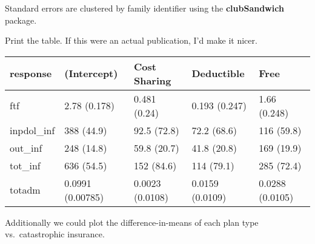 \documentclass[]{book}
\newenvironment{Shaded}{\begin{snugshade}}{\end{snugshade}}
\newcommand{\KeywordTok}[1]{\textcolor[rgb]{0.13,0.29,0.53}{\textbf{#1}}}
\newcommand{\DataTypeTok}[1]{\textcolor[rgb]{0.13,0.29,0.53}{#1}}
\newcommand{\DecValTok}[1]{\textcolor[rgb]{0.00,0.00,0.81}{#1}}
\newcommand{\StringTok}[1]{\textcolor[rgb]{0.31,0.60,0.02}{#1}}
\newcommand{\OtherTok}[1]{\textcolor[rgb]{0.56,0.35,0.01}{#1}}
\newcommand{\ControlFlowTok}[1]{\textcolor[rgb]{0.13,0.29,0.53}{\textbf{#1}}}
\newcommand{\OperatorTok}[1]{\textcolor[rgb]{0.81,0.36,0.00}{\textbf{#1}}}
\newcommand{\NormalTok}[1]{#1}
\theoremstyle{definition}
\theoremstyle{definition}
\theoremstyle{definition}
\theoremstyle{remark}
\begin{document}
Standard errors are clustered by family identifier using the
\textbf{clubSandwich} package.

Print the table. If this were an actual publication, I'd make it nicer.

\begin{Shaded}
\end{Shaded}

\begin{tabular}{l|l|l|l|l}
\hline
response & (Intercept) & Cost Sharing & Deductible & Free\\
\hline
ftf & 2.78 (0.178) & 0.481 (0.24) & 0.193 (0.247) & 1.66 (0.248)\\
\hline
inpdol\_inf & 388 (44.9) & 92.5 (72.8) & 72.2 (68.6) & 116 (59.8)\\
\hline
out\_inf & 248 (14.8) & 59.8 (20.7) & 41.8 (20.8) & 169 (19.9)\\
\hline
tot\_inf & 636 (54.5) & 152 (84.6) & 114 (79.1) & 285 (72.4)\\
\hline
totadm & 0.0991 (0.00785) & 0.0023 (0.0108) & 0.0159 (0.0109) & 0.0288 (0.0105)\\
\hline
\end{tabular}

Additionally we could plot the difference-in-means of each plan type
vs.~catastrophic insurance.
\end{document}
